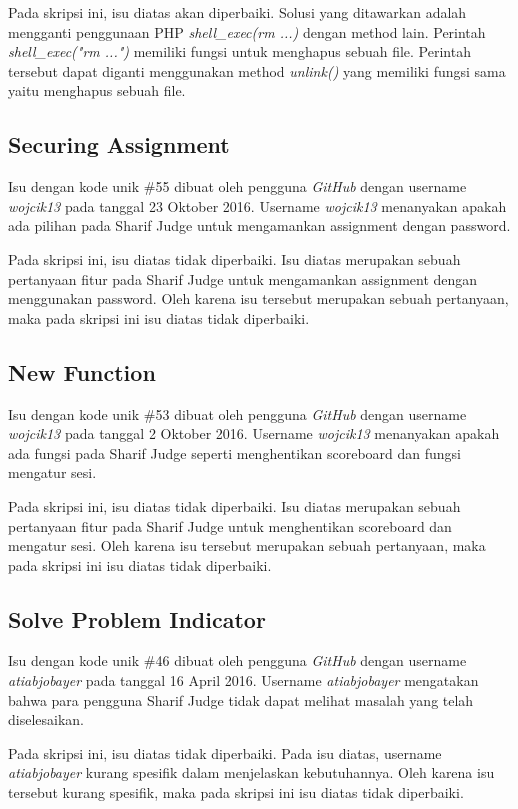 Pada skripsi ini, isu diatas akan diperbaiki. Solusi yang ditawarkan adalah mengganti penggunaan PHP \textit{shell\_exec(rm ...)} dengan method lain.  Perintah \textit{shell\_exec("rm ...")} memiliki fungsi untuk menghapus sebuah file. Perintah tersebut dapat diganti menggunakan method \textit{unlink()} yang memiliki fungsi sama yaitu menghapus sebuah file.

\subsection{Securing Assignment}
Isu dengan kode unik \#55 dibuat oleh pengguna \textit{GitHub} dengan username \textit{wojcik13} pada tanggal 23 Oktober 2016. Username \textit{wojcik13} menanyakan apakah ada pilihan pada Sharif Judge untuk mengamankan assignment dengan password.

Pada skripsi ini, isu diatas tidak diperbaiki. Isu diatas merupakan sebuah pertanyaan fitur pada Sharif Judge untuk mengamankan assignment dengan menggunakan password. Oleh karena isu tersebut merupakan sebuah pertanyaan, maka pada skripsi ini isu diatas tidak diperbaiki.

\subsection{New Function}
Isu dengan kode unik \#53 dibuat oleh pengguna \textit{GitHub} dengan username \textit{wojcik13} pada tanggal 2 Oktober 2016. Username \textit{wojcik13} menanyakan apakah ada fungsi pada Sharif Judge seperti menghentikan scoreboard dan fungsi mengatur sesi. 

Pada skripsi ini, isu diatas tidak diperbaiki. Isu diatas merupakan sebuah pertanyaan fitur pada Sharif Judge untuk menghentikan scoreboard dan mengatur sesi. Oleh karena isu tersebut merupakan sebuah pertanyaan, maka pada skripsi ini isu diatas tidak diperbaiki.

\subsection{Solve Problem Indicator}
Isu dengan kode unik \#46 dibuat oleh pengguna \textit{GitHub} dengan username \textit{atiabjobayer} pada tanggal 16 April 2016. Username \textit{atiabjobayer} mengatakan bahwa para pengguna Sharif Judge tidak dapat melihat masalah yang telah diselesaikan.

Pada skripsi ini, isu diatas tidak diperbaiki. Pada isu diatas, username \textit{atiabjobayer} kurang spesifik dalam menjelaskan kebutuhannya.
Oleh karena isu tersebut kurang spesifik, maka pada skripsi ini isu diatas tidak diperbaiki.

